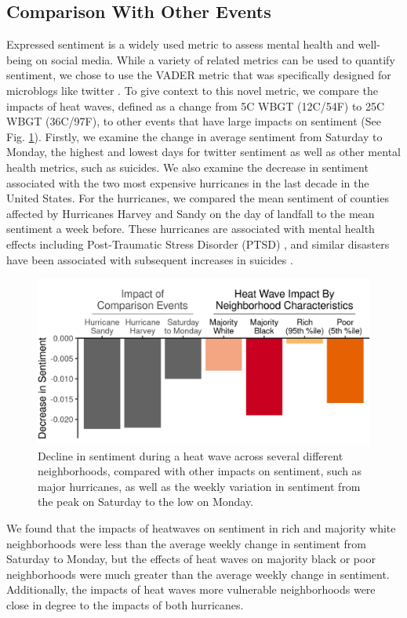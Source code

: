 \documentclass[fleqn,10pt]{wlscirep}
\begin{document}
\subsection*{Comparison With Other Events}

Expressed sentiment is a widely used metric to assess mental health and well-being on social media.  While a variety of related metrics can be used to quantify sentiment, we chose to use the VADER metric that was specifically designed for microblogs like twitter \cite{hutto2014vader}.  To give context to this novel metric, we compare the impacts of heat waves, defined as a change from 5\textdegree C WBGT (12\textdegree C/54\textdegree F) to 25\textdegree C WBGT (36\textdegree C/97\textdegree F), to other events that have large impacts on sentiment (See Fig. \ref{fig:compare}).  Firstly, we examine the change in average sentiment from Saturday to Monday, the highest and lowest days for twitter sentiment as well as other mental health metrics, such as suicides.  We also examine the decrease in sentiment associated with the two most expensive hurricanes in the last decade in the United States.  For the hurricanes, we compared the mean sentiment of counties affected by Hurricanes Harvey and Sandy on the day of landfall to the mean sentiment a week before.  These hurricanes are associated with mental health effects including Post-Traumatic Stress Disorder (PTSD) \cite{Schwartz2017Aug, Schwartz2018May}, and similar disasters have been associated with subsequent increases in suicides \cite{Krug1998Feb}.

\begin{figure}[H]
  \centering
  \includegraphics[width=0.66\linewidth]{../res/comparison_plot.png}
  \caption{Decline in sentiment during a heat wave across several different neighborhoods, compared with other impacts on sentiment, such as major hurricanes, as well as the weekly variation in sentiment from the peak on Saturday to the low on Monday.}
  \label{fig:compare}
\end{figure}

We found that the impacts of heatwaves on sentiment in rich and majority white neighborhoods were less than the average weekly change in sentiment from Saturday to Monday, but the effects of heat waves on majority black or poor neighborhoods were much greater than the average weekly change in sentiment.  Additionally, the impacts of heat waves more vulnerable neighborhoods were close in degree to the impacts of both hurricanes.
\end{document}
